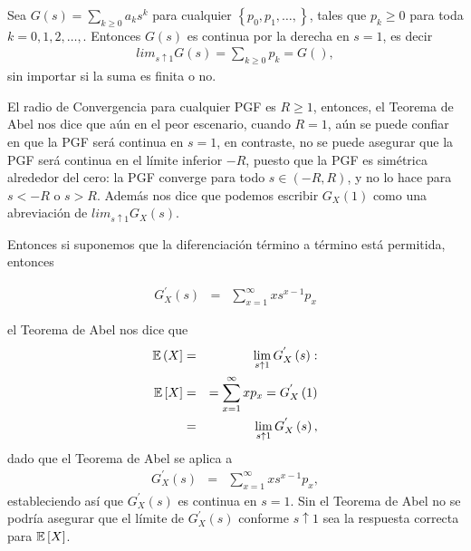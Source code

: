 \begin{Teo}
Sea $G\left(s\right)=\sum_{k\geq0}a_{k}s^{k}$ para cualquier
$\left\{p_{0},p_{1},\ldots,\right\}$, tales que $p_{k}\geq0$ para
toda $k=0,1,2,\ldots,$. Entonces $G\left(s\right)$ es continua por
la derecha en $s=1$, es decir
\begin{eqnarray*}
lim_{s\uparrow1}G\left(s\right)=\sum_{k\geq0}p_{k}=G\left(\right),
\end{eqnarray*}
sin importar si la suma es finita o no.
\end{Teo}
\begin{Note}
El radio de Convergencia para cualquier PGF es $R\geq1$, entonces,
el Teorema de Abel nos dice que a\'un en el peor escenario, cuando
$R=1$, a\'un se puede confiar en que la PGF ser\'a continua en
$s=1$, en contraste, no se puede asegurar que la PGF ser\'a
continua en el l\'imite inferior $-R$, puesto que la PGF es
sim\'etrica alrededor del cero: la PGF converge para todo
$s\in\left(-R,R\right)$, y no lo hace para $s<-R$ o $s>R$.
Adem\'as nos dice que podemos escribir $G_{X}\left(1\right)$ como
una abreviaci\'on de $lim_{s\uparrow1}G_{X}\left(s\right)$.
\end{Note}

Entonces si suponemos que la diferenciaci\'on t\'ermino a
t\'ermino est\'a permitida, entonces

\begin{eqnarray*}
G_{X}^{'}\left(s\right)&=&\sum_{x=1}^{\infty}xs^{x-1}p_{x}
\end{eqnarray*}

el Teorema de Abel nos dice que
\begin{eqnarray*}
\mathbb{E}\left(X\right]&=&\lim_{s\uparrow1}G_{X}^{'}\left(s\right):\\
\mathbb{E}\left[X\right]&=&=\sum_{x=1}^{\infty}xp_{x}=G_{X}^{'}\left(1\right)\\
&=&\lim_{s\uparrow1}G_{X}^{'}\left(s\right),
\end{eqnarray*}
dado que el Teorema de Abel se aplica a
\begin{eqnarray*}
G_{X}^{'}\left(s\right)&=&\sum_{x=1}^{\infty}xs^{x-1}p_{x},
\end{eqnarray*}
estableciendo as\'i que $G_{X}^{'}\left(s\right)$ es continua en
$s=1$. Sin el Teorema de Abel no se podr\'ia asegurar que el
l\'imite de $G_{X}^{'}\left(s\right)$ conforme $s\uparrow1$ sea la
respuesta correcta para $\mathbb{E}\left[X\right]$.


